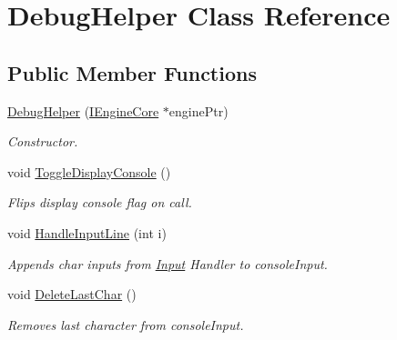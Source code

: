 \hypertarget{class_debug_helper}{}\section{Debug\+Helper Class Reference}
\label{class_debug_helper}
\subsection*{Public Member Functions}
\begin{DoxyCompactItemize}
\item 
\mbox{\label{class_debug_helper_a29d4ff680c7d62a0d291f910b18c726d}} 
\mbox{\hyperlink{class_debug_helper_a29d4ff680c7d62a0d291f910b18c726d}{Debug\+Helper}} (\mbox{\hyperlink{class_i_engine_core}{I\+Engine\+Core}} $\ast$engine\+Ptr)
\begin{DoxyCompactList}\small\item\em Constructor. \end{DoxyCompactList}\item 
\mbox{\label{class_debug_helper_a43b172bef6f51e3a6107438c58050c28}} 
void \mbox{\hyperlink{class_debug_helper_a43b172bef6f51e3a6107438c58050c28}{Toggle\+Display\+Console}} ()
\begin{DoxyCompactList}\small\item\em Flips display console flag on call. \end{DoxyCompactList}\item 
\mbox{\label{class_debug_helper_af65921d69c5e05bedb84ddd3b961a7fa}} 
void \mbox{\hyperlink{class_debug_helper_af65921d69c5e05bedb84ddd3b961a7fa}{Handle\+Input\+Line}} (int i)
\begin{DoxyCompactList}\small\item\em Appends char inputs from \mbox{\hyperlink{class_input}{Input}} Handler to console\+Input. \end{DoxyCompactList}\item 
\mbox{\label{class_debug_helper_a280c80f783830b516fc2cfe3c48646c9}} 
void \mbox{\hyperlink{class_debug_helper_a280c80f783830b516fc2cfe3c48646c9}{Delete\+Last\+Char}} ()
\begin{DoxyCompactList}\small\item\em Removes last character from console\+Input. \end{DoxyCompactList}\item 

\end{DoxyCompactItemize}
